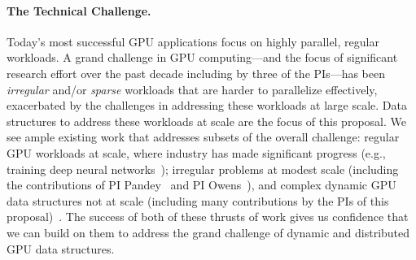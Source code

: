 \paragraph{The Technical Challenge.} Today's most successful GPU applications focus on
highly parallel, regular workloads. 
A grand challenge in GPU computing---and the focus of significant research effort over the past decade including by three of the PIs---has been
\emph{irregular} and/or \emph{sparse} workloads that are harder to parallelize
effectively, exacerbated by the challenges in addressing these workloads at large scale.
Data structures to address these workloads at scale are the focus of this proposal. We see ample existing work
that addresses subsets of the overall challenge: regular GPU workloads at
scale, where industry has made significant progress (e.g., training deep neural networks~\cite{Dubey:2024:TL3}); irregular problems at modest scale (including the contributions of  PI Pandey~\cite{} and PI Owens~\cite{Pan:2017:MGA,Chen:2022:SIP}), and complex dynamic GPU data
structures not at scale (including many contributions by the PIs of this
proposal)~\cite{Ashkiani:2018:ADH,Awad:2019:EAH,Junger:2020:WAL,Li:2021:DDH,mccoy2022high,Zhou:2021:DAD}.
 The success of both of these thrusts of work gives us confidence
that we can build on them to address the grand challenge of dynamic and
distributed GPU data structures.






